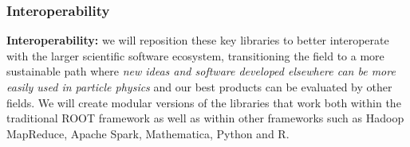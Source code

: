 \begin{frame}
\frametitle{Interoperability}

\textbf{Interoperability:}
we will reposition these key libraries to better interoperate with
the larger scientific software ecosystem, transitioning the field
to a more sustainable path where {\em new ideas
and software developed elsewhere can be more easily used in particle physics}
and our best products can be evaluated by other fields.
We will create modular versions of the libraries that work
both within the traditional ROOT framework as well as
within other frameworks such as Hadoop MapReduce, Apache Spark,
Mathematica, Python and R.

\end{frame}


